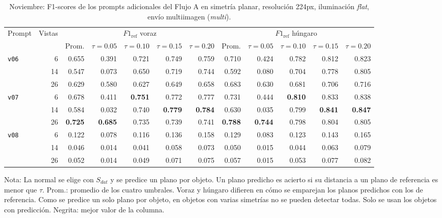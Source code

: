 \clearpage

\begin{table}[htbp]
\centering
\caption{Noviembre: F1-scores de los prompts adicionales del Flujo A en simetría planar, resolución 224px, iluminación \textit{flat}, envío multiimagen (\textit{multi}).}
\label{tab:nov_plane_adicionales_f1}
\begin{lrbox}{\tablebox}
\begin{adjustbox}{max width=\textwidth}
\begin{tabular}{lrrrrrrrrrrr}
\toprule
\multirow{2}{*}{Prompt} & \multirow{2}{*}{Vistas} & \multicolumn{5}{c}{$F1_{\mathrm{ref}}$ voraz} & \multicolumn{5}{c}{$F1_{\mathrm{ref}}$ húngaro} \\
\cmidrule(lr){3-7} \cmidrule(lr){8-12}
 &  & Prom. & $\tau{=}0.05$ & $\tau{=}0.10$ & $\tau{=}0.15$ & $\tau{=}0.20$ & Prom. & $\tau{=}0.05$ & $\tau{=}0.10$ & $\tau{=}0.15$ & $\tau{=}0.20$ \\
\midrule
\multirow{3}{*}{\texttt{v06}} & 6 & 0.655 & 0.391 & 0.721 & 0.749 & 0.759 & 0.710 & 0.424 & 0.782 & 0.812 & 0.823 \\
 & 14 & 0.547 & 0.073 & 0.650 & 0.719 & 0.744 & 0.592 & 0.080 & 0.704 & 0.778 & 0.805 \\
 & 26 & 0.629 & 0.580 & 0.627 & 0.649 & 0.658 & 0.683 & 0.630 & 0.681 & 0.706 & 0.716 \\
\midrule
\multirow{3}{*}{\texttt{v07}} & 6 & 0.678 & 0.411 & \textbf{0.751} & 0.772 & 0.777 & 0.731 & 0.444 & \textbf{0.810} & 0.833 & 0.838 \\
 & 14 & 0.584 & 0.032 & 0.740 & \textbf{0.779} & \textbf{0.784} & 0.630 & 0.035 & 0.799 & \textbf{0.841} & \textbf{0.847} \\
 & 26 & \textbf{0.725} & \textbf{0.685} & 0.735 & 0.739 & 0.741 & \textbf{0.788} & \textbf{0.744} & 0.798 & 0.804 & 0.805 \\
\midrule
\multirow{3}{*}{\texttt{v08}} & 6 & 0.122 & 0.078 & 0.116 & 0.136 & 0.158 & 0.129 & 0.083 & 0.123 & 0.143 & 0.165 \\
 & 14 & 0.046 & 0.014 & 0.041 & 0.058 & 0.073 & 0.050 & 0.015 & 0.044 & 0.063 & 0.079 \\
 & 26 & 0.052 & 0.014 & 0.049 & 0.071 & 0.075 & 0.057 & 0.015 & 0.053 & 0.077 & 0.082 \\
\bottomrule
\end{tabular}
\end{adjustbox}
\end{lrbox}
\usebox{\tablebox}

\vspace{1.5ex}
\begin{minipage}{\wd\tablebox}
\footnotesize
Nota: La normal se elige con $S_{dat}$ y se predice un plano por objeto. Un plano predicho es acierto si su distancia a un plano de referencia es menor que $\tau$. Prom.: promedio de los cuatro umbrales. Voraz y húngaro difieren en cómo se emparejan los planos predichos con los de referencia. Como se predice un solo plano por objeto, en objetos con varias simetrías no se pueden detectar todas. Solo se usan los objetos con predicción. Negrita: mejor valor de la columna.
\end{minipage}
\end{table}

